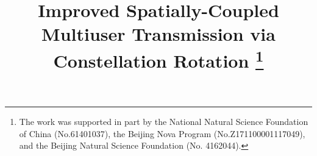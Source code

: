 \documentclass[conference]{IEEEtran}
\begin{document}
%
\title{Improved Spatially-Coupled Multiuser Transmission
via Constellation Rotation \thanks{The work was supported in part by the National Natural Science Foundation of China (No.61401037), the Beijing Nova Program (No.Z171100001117049), and the Beijing Natural Science Foundation (No. 4162044).
} }


\author{
}


%
\end{document}
